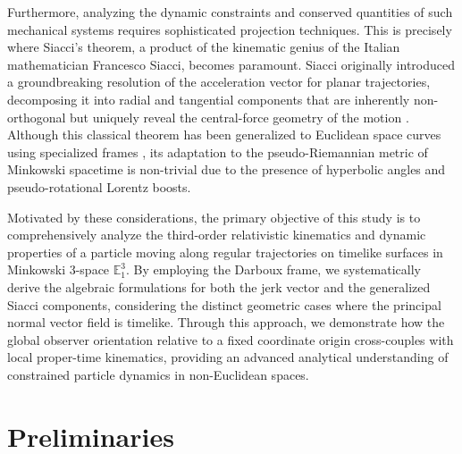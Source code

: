\documentclass[reqno]{amsart}
\theoremstyle{plain}
\numberwithin{equation}{section}
\begin{document}
Furthermore, analyzing the dynamic constraints and conserved quantities of such mechanical systems requires sophisticated projection techniques. This is precisely where Siacci's theorem, a product of the kinematic genius of the Italian mathematician Francesco Siacci, becomes paramount. Siacci originally introduced a groundbreaking resolution of the acceleration vector for planar trajectories, decomposing it into radial and tangential components that are inherently non-orthogonal but uniquely reveal the central-force geometry of the motion \cite{1,10}. Although this classical theorem has been generalized to Euclidean space curves using specialized frames \cite{6,14}, its adaptation to the pseudo-Riemannian metric of Minkowski spacetime is non-trivial due to the presence of hyperbolic angles and pseudo-rotational Lorentz boosts.

Motivated by these considerations, the primary objective of this study is to comprehensively analyze the third-order relativistic kinematics and dynamic properties of a particle moving along regular trajectories on timelike surfaces in Minkowski 3-space $\mathbb{E}_1^3$. By employing the Darboux frame, we systematically derive the algebraic formulations for both the jerk vector and the generalized Siacci components, considering the distinct geometric cases where the principal normal vector field is timelike. Through this approach, we demonstrate how the global observer orientation relative to a fixed coordinate origin cross-couples with local proper-time kinematics, providing an advanced analytical understanding of constrained particle dynamics in non-Euclidean spaces.


\section{Preliminaries}
\end{document}
